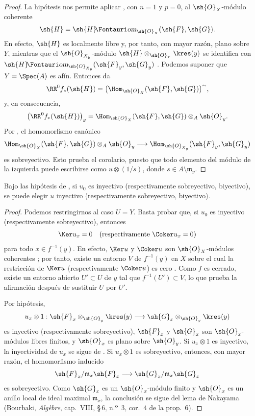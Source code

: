 \documentclass[oneside]{amsart}
\makeatletter
\newcommand*{\ega@sheafop}[3]{\sh{#1}#2\textup{\kern-2.2pt{\Fontauri\slshape #3}}}
\newcommand*{\shHom}{\ega@sheafop{H}{}{om}}
\newcommand{\oldpage}[2][]{{\marginnote{\normalfont\textbf{#1}~|~#2}}\ignorespaces}
\let\EGAOriginalLabel\label
\renewcommand{\label}[1]{\phantomsection\EGAOriginalLabel{#1}}
\makeatother
\begin{document}
\begin{proof}
La hipótesis nos permite aplicar , con $n=1$
y $p=0$, al $\sh{O}_X$-módulo coherente
\[
  \sh{H}=\shHom_{\sh{O}_X}(\sh{F},\sh{G}).
\]
En efecto, $\sh{H}$ es localmente libre y, por tanto, con mayor razón, plano sobre
$Y$, mientras que el $\sh{O}_{X_y}$-módulo
$\sh{H}\otimes_{\sh{O}_Y}\kres(y)$ se identifica con
$\shHom_{\sh{O}_{X_y}}(\sh{F}_y,\sh{G}_y)$
. Podemos suponer que $Y=\Spec(A)$ es afín.
Entonces  da
\[
  \RR^0f_*(\sh{H})
  =
  \bigl(\Hom_{\sh{O}_X}(\sh{F},\sh{G})\bigr)^{\sim},
\]
y, en consecuencia,
\[
  \bigl(\RR^0f_*(\sh{H})\bigr)_y
  =
  \Hom_{\sh{O}_X}(\sh{F},\sh{G})
    \otimes_A\sh{O}_y.
\]
Por , el homomorfismo canónico
\[
  \Hom_{\sh{O}_X}(\sh{F},\sh{G})
    \otimes_A\sh{O}_y
  \longrightarrow
  \Hom_{\sh{O}_{X_y}}(\sh{F}_y,\sh{G}_y)
\]
es sobreyectivo. Esto prueba el corolario, puesto que todo elemento del
módulo de la izquierda puede escribirse como $u\otimes(1/s)$, donde
$s\in A\setminus\mathfrak m_y$.
\end{proof}

\begin{corollary}[4.6.3]
\label{III.4.6.3}
Bajo las hipótesis de , si $u_0$ es inyectivo
\textup{(respectivamente} sobreyectivo, biyectivo), se puede elegir $u$
inyectivo (respectivamente sobreyectivo, biyectivo).
\end{corollary}

\begin{proof}
Podemos restringirnos al caso $U=Y$. Basta probar
que, si $u_0$ es inyectivo (respectivamente sobreyectivo), entonces
\[
  \Ker u_x=0
  \quad\text{(respectivamente }\Coker u_x=0\text{)}
\]
para todo $x\in f^{-1}(y)$. En efecto, $\Ker u$ y $\Coker u$ son
$\sh{O}_X$-módulos coherentes ; por tanto, existe un
entorno $V$ de $f^{-1}(y)$ en $X$ sobre el cual la restricción de
$\Ker u$ (respectivamente $\Coker u$) es cero .
Como $f$ es cerrado, existe un entorno abierto
$U'\subset U$ de $y$ tal que $f^{-1}(U')\subset V$, lo que prueba
la afirmación después de sustituir $U$ por $U'$.

\oldpage[III]{142}

Por hipótesis,
\[
  u_x\otimes1:
  \sh{F}_x\otimes_{\sh{O}_y}\kres(y)
  \longrightarrow
  \sh{G}_x\otimes_{\sh{O}_y}\kres(y)
\]
es inyectivo (respectivamente sobreyectivo), $\sh{F}_x$ y $\sh{G}_x$
son $\sh{O}_x$-módulos libres finitos, y $\sh{O}_x$ es plano sobre
$\sh{O}_y$. Si $u_x\otimes1$ es inyectivo, la inyectividad de $u_x$
se sigue de . Si $u_x\otimes1$ es sobreyectivo,
entonces, con mayor razón, el homomorfismo inducido
\[
  \sh{F}_x/\mathfrak m_x\sh{F}_x
  \longrightarrow
  \sh{G}_x/\mathfrak m_x\sh{G}_x
\]
es sobreyectivo. Como $\sh{G}_x$ es un $\sh{O}_x$-módulo finito y
$\sh{O}_x$ es un anillo local de ideal maximal $\mathfrak m_x$, la
conclusión se sigue del lema de Nakayama (Bourbaki,
\emph{Alg\`ebre}, cap.~VIII, \S\,6, n.º~3, cor.~4 de la prop.~6).
\end{proof}
\end{document}
